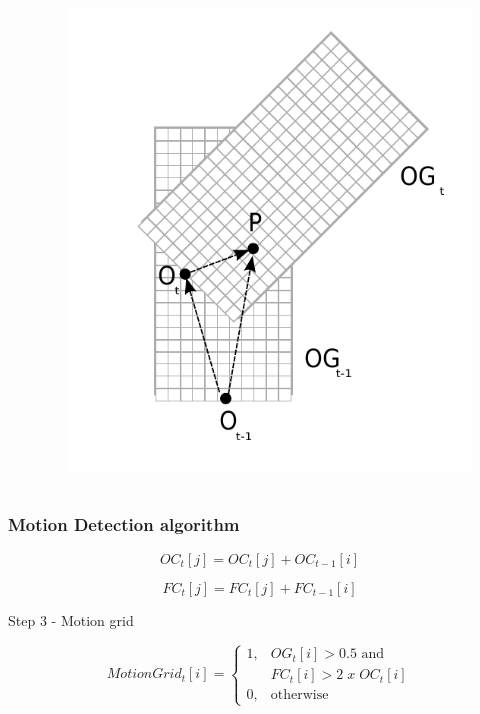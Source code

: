 \documentclass{beamer}
\begin{document}
\begin{frame}
\begin{columns}[t]
\begin{column}{5cm}
		  \end{column}
		  \begin{column}{5cm}
			\begin{figure}[h]
			\center
			\includegraphics[scale=0.6]{../img/fig:translation}
			\end{figure}	
		  \end{column}
		 \end{columns}		 

	\end{frame}

	\begin{frame}
		\frametitle{Motion Detection algorithm}		

			\begin{equation*}
			OC_t[j] = OC_t[j] + OC_{t-1}[i]
			\end{equation*}  

			\begin{equation*}
			FC_t[j] = FC_t[j] + FC_{t-1}[i]
			\end{equation*}		 		

		
		\begin{block}{Step 3 - Motion grid}	

		\begin{equation*}
			MotionGrid_t[i] = \begin{cases} 1, & \mbox{$OG_t[i] > 0.5$ and} \\ & \mbox {$FC_t[i]>2\;  x \; OC_t[i]$} \\
		                                0, & \mbox{otherwise}\end{cases}
		\end{equation*}		
				
		\end{block}		
		

		
	\end{frame}
\end{document}
